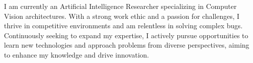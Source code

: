 I am currently an Artificial Intelligence Researcher specializing in Computer Vision architectures. With a strong work ethic and a passion for challenges, I thrive in competitive environments and am relentless in solving complex bugs. Continuously seeking to expand my expertise, I actively pursue opportunities to learn new technologies and approach problems from diverse perspectives, aiming to enhance my knowledge and drive innovation.
